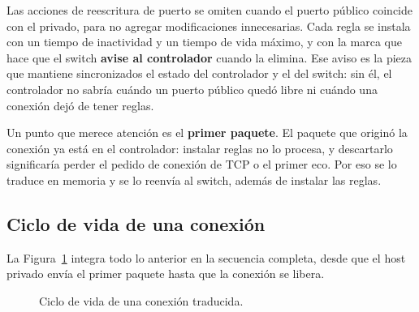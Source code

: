 ﻿\documentclass[10pt,a4paper]{article}
\begin{document}
Las acciones de reescritura de puerto se omiten cuando el puerto público coincide con
el privado, para no agregar modificaciones innecesarias. Cada regla se instala con un
tiempo de inactividad y un tiempo de vida máximo, y con la marca que hace que el
switch \textbf{avise al controlador} cuando la elimina. Ese aviso es la pieza que
mantiene sincronizados el estado del controlador y el del switch: sin él, el
controlador no sabría cuándo un puerto público quedó libre ni cuándo una conexión
dejó de tener reglas.

Un punto que merece atención es el \textbf{primer paquete}. El paquete que originó la
conexión ya está en el controlador: instalar reglas no lo procesa, y descartarlo
significaría perder el pedido de conexión de TCP o el primer eco. Por eso se lo
traduce en memoria y se lo reenvía al switch, además de instalar las reglas.

\subsection{Ciclo de vida de una conexión}

La Figura~\ref{fig:ciclo} integra todo lo anterior en la secuencia completa, desde
que el host privado envía el primer paquete hasta que la conexión se libera.

\begin{figure}[H]
\centering
{}
\caption{Ciclo de vida de una conexión traducida.}
\label{fig:ciclo}
\end{figure}
\end{document}
